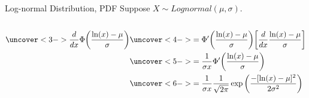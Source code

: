 \documentclass[handout]{beamer}
\begin{document}
\begin{frame}{Log-normal Distribution, PDF}
    Suppose $X\sim Lognormal(\mu,\sigma)$.\\
    \\
    \begin{align*}
        \uncover<3->{\frac{d}{dx} \Phi\bigg(\frac{\ln(x) - \mu}{\sigma} \bigg)  } & \uncover<4->{ = \Phi'\bigg(\frac{\ln(x) - \mu}{\sigma} \bigg) \bigg[ \frac{d}{dx} \frac{\ln(x) - \mu}{\sigma} \bigg] } \\
                                                                                  & \uncover<5->{ = \frac{1}{\sigma x} \Phi'\bigg(\frac{\ln(x) - \mu}{\sigma} \bigg)  }                                    \\
                                                                                  & \uncover<6->{ = \frac{1}{\sigma x} \frac{1}{\sqrt{2\pi}} \exp\bigg( \frac{-[\ln(x) - \mu]^2}{2 \sigma^2}\bigg)  }      \\
    \end{align*}
    \vfill
\end{frame}
\end{document}
